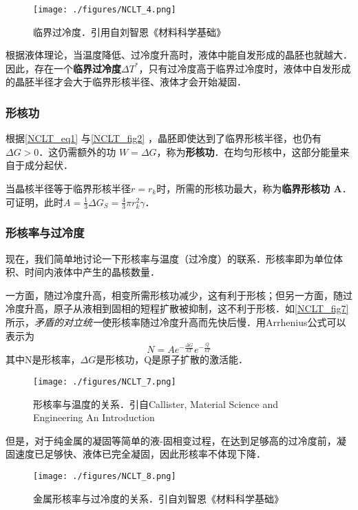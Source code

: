 \begin{figure}[ht]
\centering
\texttt{[image: ./figures/NCLT\_4.png]}
\caption{临界过冷度．引用自刘智恩《材料科学基础》} \label{NCLT_fig4}
\end{figure}
根据液体理论，当温度降低、过冷度升高时，液体中能自发形成的晶胚也就越大．因此，存在一个\textbf{临界过冷度$\Delta T^*$}，只有过冷度高于临界过冷度时，液体中自发形成的晶胚半径才会大于临界形核半径、液体才会开始凝固．

\subsubsection{形核功}
根据\autoref{NCLT_eq1} 与\autoref{NCLT_fig2} ，晶胚即使达到了临界形核半径，也仍有$\Delta G>0$．这仍需额外的功 $W=\Delta G$，称为\textbf{形核功}．在均匀形核中，这部分能量来自于成分起伏．

当晶核半径等于临界形核半径$r=r_k$时，所需的形核功最大，称为\textbf{临界形核功 A}．可证明，此时$A=\frac{1}{3}\Delta G_S=\frac{4}{3}\pi r_k^2 \gamma$．%

\subsubsection{形核率与过冷度}
现在，我们简单地讨论一下形核率与温度（过冷度）的联系．形核率即为单位体积、时间内液体中产生的晶核数量．%

一方面，随过冷度升高，相变所需形核功减少，这有利于形核；但另一方面，随过冷度升高，原子从液相到固相的短程扩散被抑制，这不利于形核．如\autoref{NCLT_fig7} 所示，\textsl{矛盾的对立统一}使形核率随过冷度升高而先快后慢．用Arrhenius公式可以表示为
$$N=Ae^{-\frac{\Delta G}{kT}}e^{-\frac{Q}{kT}}$$
其中N是形核率，$\Delta G$是形核功，Q是原子扩散的激活能．
\begin{figure}[ht]
\centering
\texttt{[image: ./figures/NCLT\_7.png]}
\caption{形核率与温度的关系．引自Callister, Material Science and Engineering An Introduction} \label{NCLT_fig7}
\end{figure}
但是，对于纯金属的凝固等简单的液-固相变过程，在达到足够高的过冷度前，凝固速度已足够快、液体已完全凝固，因此形核率不体现下降．
\begin{figure}[ht]
\centering
\texttt{[image: ./figures/NCLT\_8.png]}
\caption{金属形核率与过冷度的关系．引自刘智恩《材料科学基础》} \label{NCLT_fig8}
\end{figure}

